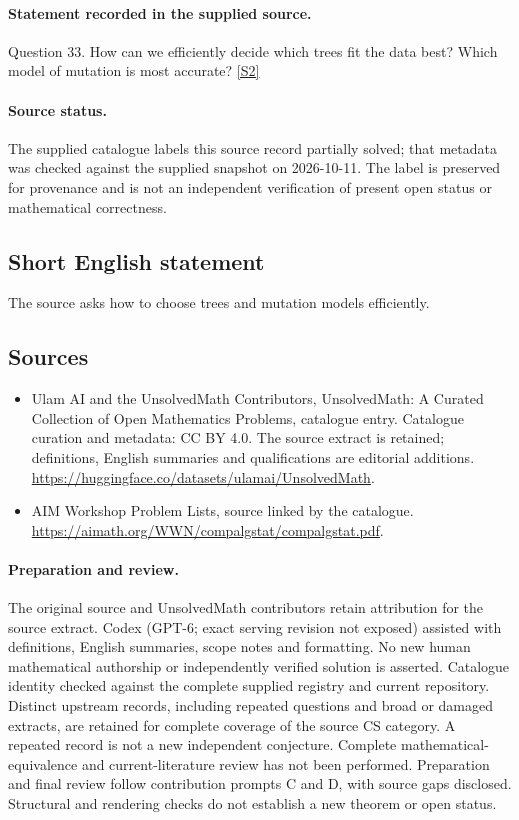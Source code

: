 \documentclass[11pt]{article}
\begin{document}
\paragraph{Statement recorded in the supplied source.}
Question 33. How can we efficiently decide which trees fit the data best? Which model of mutation is most accurate? \href{https://aimath.org/WWN/compalgstat/compalgstat.pdf}{[S2]}
\paragraph{Source status.}
The supplied catalogue labels this source record partially solved; that metadata was checked against the supplied snapshot on 2026-10-11. The label is preserved for provenance and is not an independent verification of present open status or mathematical correctness.
\subsection{Short English statement}
The source asks how to choose trees and mutation models efficiently.
\subsection{Sources}
\begin{itemize}
\item[S1] Ulam AI and the UnsolvedMath Contributors, UnsolvedMath: A Curated Collection of Open Mathematics Problems, catalogue entry. Catalogue curation and metadata: CC BY 4.0. The source extract is retained; definitions, English summaries and qualifications are editorial additions.
\url{https://huggingface.co/datasets/ulamai/UnsolvedMath}.
\item[S2] AIM Workshop Problem Lists, source linked by the catalogue.
\url{https://aimath.org/WWN/compalgstat/compalgstat.pdf}.
\end{itemize}
\paragraph{Preparation and review.}
The original source and UnsolvedMath contributors retain attribution for the source extract. Codex (GPT-6; exact serving revision not exposed) assisted with definitions, English summaries, scope notes and formatting. No new human mathematical authorship or independently verified solution is asserted. Catalogue identity checked against the complete supplied registry and current repository. Distinct upstream records, including repeated questions and broad or damaged extracts, are retained for complete coverage of the source CS category. A repeated record is not a new independent conjecture. Complete mathematical-equivalence and current-literature review has not been performed. Preparation and final review follow contribution prompts C and D, with source gaps disclosed. Structural and rendering checks do not establish a new theorem or open status.
\label{end:statement}
\end{document}
